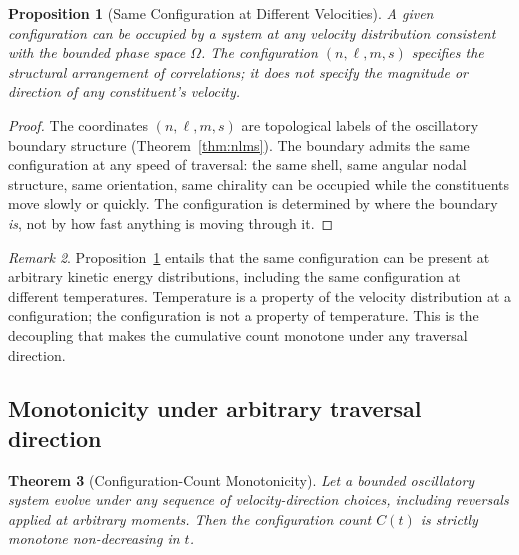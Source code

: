 \documentclass[twocolumn,10pt,a4paper]{article}
\theoremstyle{thmstyle}
\newtheorem{theorem}{Theorem}[section]
\newtheorem{proposition}[theorem]{Proposition}
\theoremstyle{definition}
\theoremstyle{remark}
\newtheorem{remark}[theorem]{Remark}
\begin{document}
\begin{proposition}[Same Configuration at Different Velocities]
\label{prop:decouple}
A given configuration can be occupied by a system at any velocity
distribution consistent with the bounded phase space $\Omega$. The
configuration $(n,\ell,m,s)$ specifies the structural arrangement of
correlations; it does not specify the magnitude or direction of any
constituent's velocity.
\end{proposition}

\begin{proof}
The coordinates $(n,\ell,m,s)$ are topological labels of the
oscillatory boundary structure (Theorem~\ref{thm:nlms}). The boundary
admits the same configuration at any speed of traversal: the same
shell, same angular nodal structure, same orientation, same chirality
can be occupied while the constituents move slowly or quickly. The
configuration is determined by where the boundary \emph{is}, not by
how fast anything is moving through it.
\end{proof}

\begin{remark}
\label{rem:tempindep}
Proposition~\ref{prop:decouple} entails that the same configuration
can be present at arbitrary kinetic energy distributions, including
the same configuration at different temperatures. Temperature is a
property of the velocity distribution at a configuration; the
configuration is not a property of temperature. This is the decoupling
that makes the cumulative count monotone under any traversal direction.
\end{remark}

\subsection{Monotonicity under arbitrary traversal direction}

\begin{theorem}[Configuration-Count Monotonicity]
\label{thm:mono}
Let a bounded oscillatory system evolve under any sequence of
velocity-direction choices, including reversals applied at arbitrary
moments. Then the configuration count $C(t)$ is strictly monotone
non-decreasing in $t$.
\end{theorem}
\end{document}
